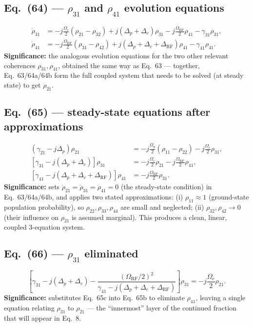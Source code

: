 \documentclass[11pt]{article}
\begin{document}
\subsection*{Eq.~(64) --- $\rho_{31}$ and $\rho_{41}$ evolution equations}
\begin{align}
\dot\rho_{31} &= -j\frac{\Omega_c}{2}(\rho_{21}-\rho_{32})+j(\Delta_p+\Delta_c)\rho_{31}-j\frac{\Omega_\text{RF}}{2}\rho_{41}-\gamma_{31}\rho_{31}, \tag{64a}\\
\dot\rho_{41} &= -j\frac{\Omega_\text{RF}}{2}(\rho_{31}-\rho_{42})+j(\Delta_p+\Delta_c+\Delta_\text{RF})\rho_{41}-\gamma_{41}\rho_{41}. \tag{64b}
\end{align}
\textbf{Significance:} the analogous evolution equations for the two
other relevant coherences $\rho_{31},\rho_{41}$, obtained the same way
as Eq.~63 --- together, Eq.~63/64a/64b form the full coupled system that
needs to be solved (at steady state) to get $\rho_{21}$.

\subsection*{Eq.~(65) --- steady-state equations after approximations}
\begin{align}
(\gamma_{21}-j\Delta_p)\rho_{21} &= -j\frac{\Omega_p}{2}(\rho_{11}-\rho_{22})-j\frac{\Omega_c}{2}\rho_{31}, \tag{65a}\\
[\gamma_{31}-j(\Delta_p+\Delta_c)]\rho_{31} &= -j\frac{\Omega_c}{2}\rho_{21}-j\frac{\Omega_\text{RF}}{2}\rho_{41}, \tag{65b}\\
[\gamma_{41}-j(\Delta_p+\Delta_c+\Delta_\text{RF})]\rho_{41} &= -j\frac{\Omega_\text{RF}}{2}\rho_{31}. \tag{65c}
\end{align}
\textbf{Significance:} sets $\dot\rho_{21}=\dot\rho_{31}=\dot\rho_{41}=0$
(the steady-state condition) in Eq.~63/64a/64b, and applies two stated
approximations: (i) $\rho_{11}\approx1$ (ground-state population
probability), so $\rho_{22},\rho_{33},\rho_{44}$ are small and neglected;
(ii) $\rho_{32},\rho_{42}\to0$ (their influence on $\rho_{21}$ is
assumed marginal). This produces a clean, linear, coupled 3-equation
system.

\subsection*{Eq.~(66) --- $\rho_{31}$ eliminated}
\begin{equation}
\left[\gamma_{31}-j(\Delta_p+\Delta_c)-\frac{(\Omega_\text{RF}/2)^2}{\gamma_{41}-j(\Delta_p+\Delta_c+\Delta_\text{RF})}\right]\rho_{31} = -j\frac{\Omega_c}{2}\rho_{21}. \tag{66}
\end{equation}
\textbf{Significance:} substitutes Eq.~65c into Eq.~65b to eliminate
$\rho_{41}$, leaving a single equation relating $\rho_{31}$ to
$\rho_{21}$ --- the ``innermost'' layer of the continued fraction that
will appear in Eq.~8.
\end{document}
